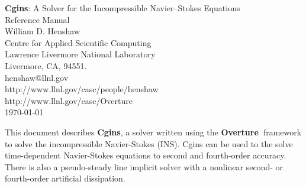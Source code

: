 \documentclass[12pt]{article}
\newcommand{\Overture}{{\bf Over\-ture\ }}
\begin{document}


\def\comma  {~~~,~~}
\newcommand{\uvd}{\mathbf{U}}
\def\ud     {{    U}}
\def\pd     {{    P}}
\def\calo{{\cal O}}

\newcommand{\mbar}{\bar{m}}
\newcommand{\Rbar}{\bar{R}}
\newcommand{\Ru}{R_u}         %
\newcommand{\Div}{\grad\cdot}
\newcommand{\tauv}{\boldsymbol{\tau}}
\newcommand{\thetav}{\boldsymbol{\theta}}

\newcommand{\Omegav}{\boldsymbol{\Omega}}
\newcommand{\omegav}{\boldsymbol{\omega}}
\newcommand{\sigmav}{\boldsymbol{\sigma}}
\newcommand{\cm}{{\rm cm}}

\newcommand{\sumi}{\sum_{i=1}^n}
\newcommand{\dt}{{\Delta t}}

\def\ff {\tt} %

\vspace{5\baselineskip}
\begin{flushleft}
{\Large
{\bf Cgins}: A Solver for the Incompressible Navier--Stokes Equations \\
    Reference Manual \\
}
\vspace{2\baselineskip}
William D. Henshaw  \\
Centre for Applied Scientific Computing  \\
Lawrence Livermore National Laboratory      \\
Livermore, CA, 94551.  \\
henshaw@llnl.gov \\
http://www.llnl.gov/casc/people/henshaw \\
http://www.llnl.gov/casc/Overture\\
\vspace{\baselineskip}
\today\\
\vspace{\baselineskip}

\vspace{4\baselineskip}


This document describes {\bf Cgins}, a solver written using the \Overture framework
to solve the incompressible Navier-Stokes (INS).  
Cgins can be used to the solve time-dependent Navier-Stokes equations to
second and fourth-order accuracy. There is also a pseudo-steady line implicit solver with
a nonlinear second- or fourth-order artificial dissipation.

\end{flushleft}
\end{document}
